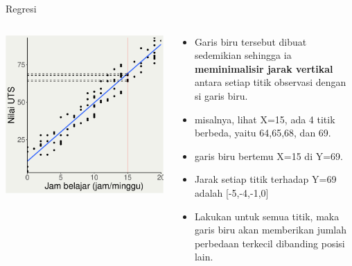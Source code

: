 \documentclass[
  ignorenonframetext,
]{beamer}
\providecommand{\tightlist}{%
  \setlength{\itemsep}{0pt}\setlength{\parskip}{0pt}}\usepackage{longtable,booktabs,array}
\begin{document}
\begin{frame}{Regresi}
\label{regresi-2}
\begin{columns}[T]
\begin{column}{0.47\textwidth}
\includegraphics{index_files/figure-beamer/unnamed-chunk-22-1.pdf}
\end{column}

\begin{column}{0.47\textwidth}
\begin{itemize}
\tightlist
\item
  Garis biru tersebut dibuat sedemikian sehingga ia
  \textbf{meminimalisir jarak vertikal} antara setiap titik observasi
  dengan si garis biru.
\item
  misalnya, lihat X=15, ada 4 titik berbeda, yaitu 64,65,68, dan 69.
\item
  garis biru bertemu X=15 di Y=69.
\item
  Jarak setiap titik terhadap Y=69 adalah {[}-5,-4,-1,0{]}
\item
  Lakukan untuk semua titik, maka garis biru akan memberikan jumlah
  perbedaan terkecil dibanding posisi lain.
\end{itemize}
\end{column}
\end{columns}
\end{frame}
\end{document}

